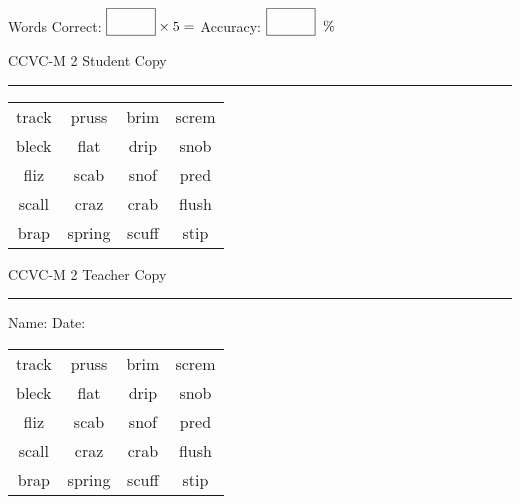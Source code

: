 \documentclass{memoir}
\begin{document}
\small

Words Correct: $\fbox{\phantom{\huge 100}} \times 5 = $ Accuracy: $\fbox{\phantom{\huge 100}}\;\; \%$ 

\vfill

\newpage


\footnotesize \noindent
CCVC-M 2 \hfill Student Copy
\smallskip
\hrule

\Large

\setlength{\tabcolsep}{14pt}
\def\arraystretch{3}

{\selectfont


\begin{vplace}[0.5]
\begin{center}
\begin{tabular}{cccc}
track       & pruss       & brim      & screm \\
bleck & flat             & drip & snob \\
fliz & scab & snof & pred \\
scall & craz        & crab        & flush \\
brap               & spring & scuff & stip \\
\end{tabular}
\end{center}
\end{vplace}

}

\newpage

\footnotesize \noindent
CCVC-M 2 \hfill Teacher Copy
\smallskip
\hrule

\small

\vfill

\noindent
Name: \underline{\hspace{1.75in}} \hfill Date: \underline{\hspace{1in}}

\Large

{\selectfont


\begin{vplace}[0.5]
\begin{center}
\begin{tabular}{cccc}
track       & pruss       & brim      & screm \\
bleck & flat             & drip & snob \\
fliz & scab & snof & pred \\
scall & craz        & crab        & flush \\
brap               & spring & scuff & stip \\
\end{tabular}
\end{center}
\end{vplace}



}
\end{document}
